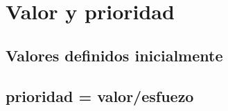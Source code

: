 \section{Valor y prioridad}
\subsection{Valores definidos inicialmente}


\subsection{prioridad = valor/esfuezo}